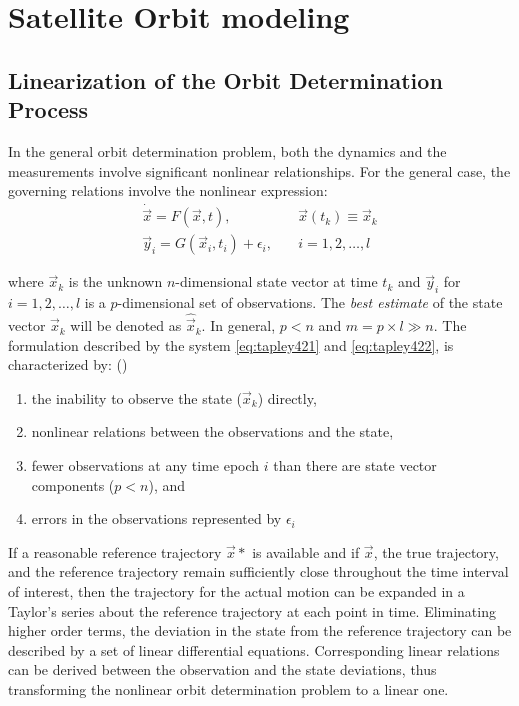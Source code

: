\chapter{Satellite Orbit modeling}
\label{ch:satellite-orbit-modeling}

\section{Linearization of the Orbit Determination Process}
In the general orbit determination problem, both the dynamics and the measurements 
involve significant nonlinear relationships. For the general case, the governing 
relations involve the nonlinear expression:
\begin{subequations}
\begin{align}
  \dot{\vec{x}} = F( \vec{x}, t ), 
    & \quad \vec{x}(t_k ) \equiv \vec{x}_k 
    \label{eq:tapley421}\\
  \vec{y}_i = G( \vec{x}_i , t_i ) + {\epsilon}_i , 
    & \quad  i=1,2,\ldots ,l
    \label{eq:tapley422}
\end{align}
\end{subequations}

where \(\vec{x}_k\) is the unknown \(n\)-dimensional state vector at time \(t_k\) and 
\(\vec{y}_i\) for \(i=1,2,\ldots ,l\) is a \(p\)-dimensional set of observations. The 
\emph{best estimate} of the state vector \(\vec{x}_k\) will be denoted as \(\hat{\vec{x}}_k\). 
In general, \(p<n\) and \( m = p \times l \gg n \). The formulation described by the 
system \ref{eq:tapley421} and \ref{eq:tapley422}, is characterized by: (\cite{tapley})
\begin{enumerate}
  \item the inability to observe the state (\(\vec{x}_k\)) directly,
  \item nonlinear relations between the observations and the state, 
  \item fewer observations at any time epoch \(i\) than there are state vector 
  components (\(p<n\)), and 
  \item errors in the observations represented by \({\epsilon}_i\)
\end{enumerate}

If a reasonable reference trajectory \(\vec{x}*\) is available and if 
\(\vec{x}\), the true trajectory, and the reference trajectory remain sufficiently 
close throughout the time interval of interest, then the trajectory for the actual 
motion can be expanded in a Taylor’s series about the reference trajectory at 
each point in time. Eliminating higher order terms, the deviation in the state
from the reference trajectory can be described by a set of linear differential 
equations. Corresponding linear relations can be derived between the observation 
and the state deviations, thus transforming the nonlinear orbit determination problem 
to a linear one.

